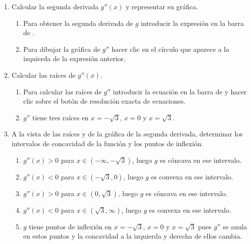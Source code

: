 \begin{enumerate}[leftmargin=*]
\begin{enumerate}
      \item Calcular la segunda derivada $g''(x)$ y representar su gráfica.
            \begin{indication}
            \begin{enumerate}
            \item Para obtener la segunda derivada de $g$ introducir la expresión  en la barra de .
            \item Para dibujar la gráfica de $g''$ hacer clic en el círculo que aparece a la izquierda de la expresión anterior.
            \end{enumerate}
            \end{indication}

      \item Calcular las raíces de $g''(x).$
            \begin{indication}
            \begin{enumerate}
            \item Para calcular las raíces de $g''$ introducir la ecuación  en la barra de  y hacer clic sobre el botón de resolución exacta de ecuaciones.
            \item $g''$ tiene tres raíces en $x=-\sqrt{3}$, $x=0$ y $x=\sqrt{3}$.
            \end{enumerate}
            \end{indication}

      \item A la vista de las raíces y de la gráfica de la segunda derivada, determinar los intervalos de concavidad de la función y los puntos de inflexión.
            \begin{indication}
            \begin{enumerate}
            \item $g''(x)>0$ para $x\in (-\infty, -\sqrt{3})$, luego $g$ es cóncava en ese intervalo.
            \item $g''(x)<0$ para $x\in (-\sqrt{3}, 0)$, luego $g$ es convexa en ese intervalo.
            \item $g''(x)>0$ para $x\in (0, \sqrt{3})$, luego $g$ es cóncava en ese intervalo.
            \item $g''(x)<0$ para $x\in (\sqrt{3}, \infty)$, luego $g$ es convexa en ese intervalo.
            \item $g$ tiene puntos de inflexión en $x=-\sqrt{3}$, $x=0$ y $x=\sqrt{3}$ pues $g''$ se anula en estos puntos y la concavidad a la izquierda y derecha de ellos cambia.
            \end{enumerate}
            \end{indication}
      \end{enumerate}

\end{enumerate}


